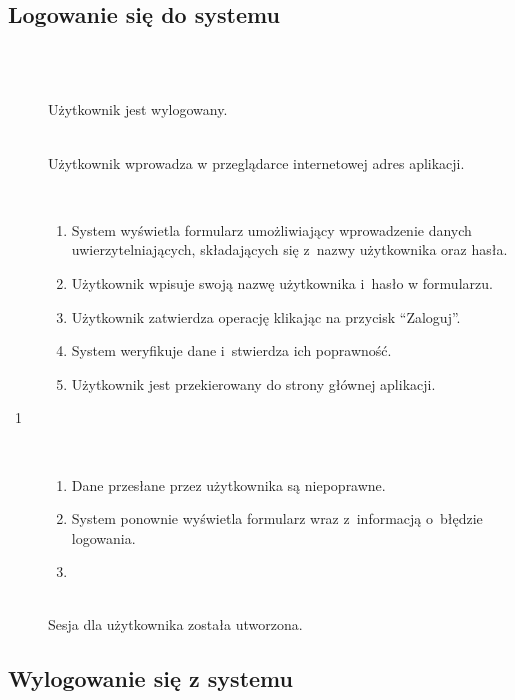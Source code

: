 \documentclass[11pt]{aghdpl}
\begin{document}
\subsection{Logowanie się do systemu}	
	\begin{description}
		\item[\useCaseAktor] \hfill \\
			\useCaseUzytkownik
		\item[\useCaseWarPocz] \hfill \\
			Użytkownik jest wylogowany.
		\item[\useCaseZdarzInicj] \hfill \\
			Użytkownik wprowadza w przeglądarce internetowej adres aplikacji.
		\item[\useCaseScenBaz] \hfill \\ 
			\begin{enumerate}
			\item System wyświetla formularz umożliwiający wprowadzenie danych uwierzytelniających, składających się z~nazwy użytkownika oraz hasła.
			\item Użytkownik wpisuje swoją nazwę użytkownika i~hasło w formularzu.
			\item Użytkownik zatwierdza operację klikając na przycisk ``Zaloguj''.
			\item System weryfikuje dane i~stwierdza ich poprawność.
			\item{Użytkownik jest przekierowany do strony głównej aplikacji.}
			\end{enumerate}
		\item[\useCaseScenAlt~1] \hfill \\
			\begin{enumerate}[label=4a\arabic*.]
			\item Dane przesłane przez użytkownika są niepoprawne.
			\item System ponownie wyświetla formularz wraz z~informacją o~błędzie logowania.
			\item {}
			\end{enumerate}
		\item[\useCaseWarKonc] \hfill \\ 
			Sesja dla użytkownika została utworzona.
	\end{description}


\subsection{Wylogowanie się z systemu}
\end{document}
